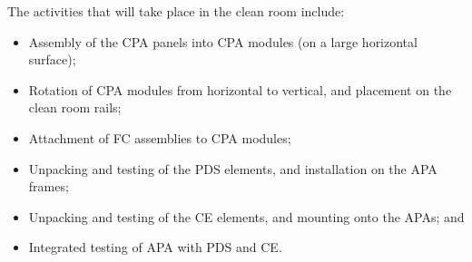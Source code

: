 The activities that will take place in the clean room include:
\begin{itemize}
\item Assembly of the CPA panels into CPA modules (on a large horizontal surface);
\item Rotation of CPA modules from horizontal to vertical, and placement on the clean room rails; 
\item Attachment of FC assemblies to CPA modules;
\item Unpacking and testing of the PDS elements, and installation on the APA frames;
\item Unpacking and testing of the CE elements, and mounting onto the APAs; and  
\item Integrated testing of APA with PDS and CE.  
\end{itemize}


